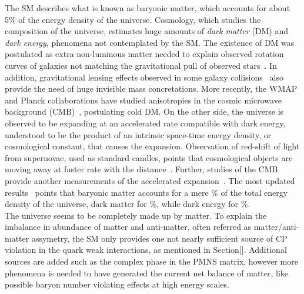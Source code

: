 The SM describes what is known as baryonic matter, which accounts for about 5\% of the energy density of the universe. Cosmology, which studies the composition of the universe, estimates huge amounts of \textit{dark matter} (DM) and \textit{dark energy}, phenomena not contemplated by the SM. The existence of DM was postulated as extra non-luminous matter needed to explain observed rotation curves of galaxies not matching the gravitational pull of observed stars~\cite{}. In addition, gravitational lensing effects observed in some galaxy collisions~\cite{} also provide the need of huge invisible mass concretations. More recently, the WMAP and Planck collaborations have studied anisotropies in the cosmic microwave background (CMB)~\cite{}, postulating cold DM. On the other side, the universe is observed to be expanding at an accelerated rate compatible with dark energy, understood to be the product of an intrinsic space-time energy density, or cosmological constant, that causes the expansion. Observation of red-shift of light from supernovae, used as standard candles, points that cosmological objects are moving away at faster rate with the distance~\cite{}. Further, studies of the CMB provide another measurements of the accelerated expansion~\cite{}. The most updated results~\cite{} points that baryonic matter accounts for a mere \% of the total energy density of the universe, dark matter for \%, while dark energy for \%.\\

The universe seems to be completely made up by matter. To explain the imbalance in abundance of matter and anti-matter, often referred as matter/anti-matter assymetry, the SM only provides one not nearly sufficient source of CP violation in the quark weak interactions, as mentioned in Section[]. Additional sources are added such as the complex phase in the PMNS matrix, however more phenomena is needed to have generated the current net balance of matter, like possible baryon number violating effects at high energy scales.\\

